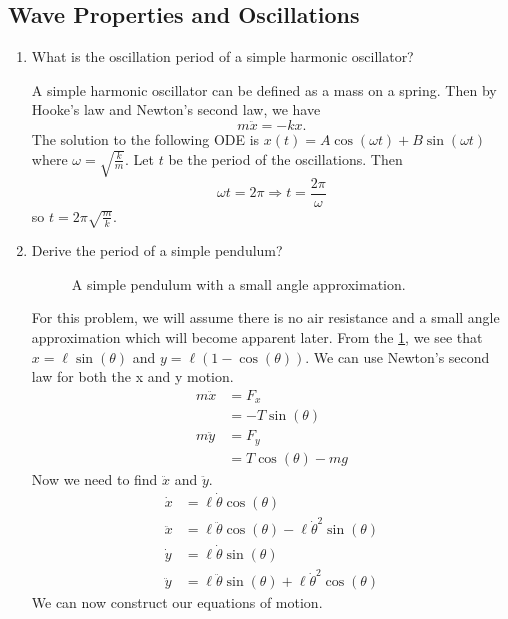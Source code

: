 \subsection{Wave Properties and Oscillations}

\begin{enumerate}
\item
  What is the oscillation period of a simple harmonic oscillator?
  \par\smallskip
  A simple harmonic oscillator can be defined as a mass on a spring.
  Then by Hooke's law and Newton's second law, we have
  \[
  m\ddot{x} = -kx.
  \]
  The solution to the following ODE is
  \(x(t) = A\cos(\omega t) + B\sin(\omega t)\) where
  \(\omega = \sqrt{\frac{k}{m}}\).
  Let \(t\) be the period of the oscillations.
  Then
  \[
  \omega t = 2\pi\Rightarrow t = \frac{2\pi}{\omega}
  \]
  so \(t = 2\pi\sqrt{\frac{m}{k}}\).
\item
  Derive the period of a simple pendulum?
  \begin{figure}[H]
    \centering
    
    \caption{A simple pendulum with a small angle approximation.}
    \label{NUPOCphysicswaves2}
  \end{figure}
  For this problem, we will assume there is no air resistance and a small angle
  approximation which will become apparent later.
  From the \cref{NUPOCphysicswaves2}, we see that \(x = \ell\sin(\theta)\) and
  \(y = \ell(1 - \cos(\theta))\).
  We can use Newton's second law for both the x and y motion.
  \begin{align*}
    m\ddot{x} &= F_x\\
              &= -T\sin(\theta)\\
    m\ddot{y} &= F_y\\
              &= T\cos(\theta) - mg
  \end{align*}
  Now we need to find \(\ddot{x}\) and \(\ddot{y}\).
  \begin{align*}
    \dot{x} &= \ell\dot{\theta}\cos(\theta)\\
    \ddot{x} &= \ell\ddot{\theta}\cos(\theta) -
                \ell\dot{\theta}^2\sin(\theta)\\
    \dot{y} &= \ell\dot{\theta}\sin(\theta)\\
    \ddot{y} &= \ell\ddot{\theta}\sin(\theta) + \ell\dot{\theta}^2\cos(\theta)
  \end{align*}
  We can now construct our equations of motion.

\end{enumerate}
